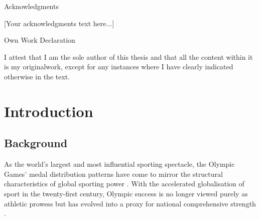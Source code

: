 \documentclass[11pt,twoside]{article}
\numberwithin{Theorem}{section}
\numberwithin{Definition}{section}
\numberwithin{Lemma}{section}
\numberwithin{Algorithm}{section}
\numberwithin{equation}{section}
\begin{document}
\clearpage

\begin{center}
\Large{Acknowledgments}
\end{center}

[Your acknowledgments text here...]

\clearpage

\begin{center}
\Large{Own Work Declaration}
\end{center}

I attest that I am the sole author of this thesis and that all the content within it is my originalwork, except for any instances where I have clearly indicated otherwise in the text.

\cleardoublepage

\pagestyle{plain}
\setcounter{page}{1}

\tableofcontents
\clearpage
\listoftables
\listoffigures
\cleardoublepage

\setcounter{page}{1}

\section{Introduction}
\label{sec.intro}

\subsection{Background}
\label{subsec:background}

As the world's largest and most influential sporting spectacle, the Olympic Games' medal distribution patterns have come to mirror the structural characteristics of global sporting power \cite{smith2022}. With the accelerated globalisation of sport in the twenty-first century, Olympic success is no longer viewed purely as athletic prowess but has evolved into a proxy for national comprehensive strength \cite{li2020}. 
\end{document}
